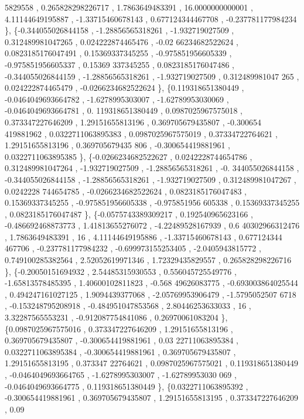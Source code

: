 \begin{DoxyCode}
      5829558 , 0.265828298226717 ,   1.7863649483391 ,  16.0000000000001 ,  4.11144649195887 , -1.33715460678143 
      , 0.677124344467708 , -0.237781177984234 \},
\{-0.344055026844158 , -1.28856565318261 ,   -1.932719027509 , 0.312489981047265 , 0.024222874465476 , -0.02
      66234682522624 , 0.0823185176047491 ,  0.15369337345255 , -0.975851956605339 , -0.975851956605337 ,  0.15369
      337345255 , 0.0823185176047486 , -0.344055026844159 , -1.28856565318261 ,   -1.932719027509 , 0.312489981047
      265 , 0.024222874465479 , -0.0266234682522624 \},
\{0.119318651380449 , -0.0464049693664782 ,  -1.6278995303007 , -1.62789953030069 , -0.0464049693664781 , 0.
      119318651380449 , 0.0987025967575018 , 0.373347227646209 ,  1.29151655813196 , 0.369705679435807 , -0.300654
      419881962 , 0.0322711063895383 , 0.0987025967575019 ,  0.37334722764621 ,  1.29151655813196 , 0.369705679435
      806 , -0.300654419881961 , 0.0322711063895385 \},
\{-0.0266234682522627 , 0.0242228744654786 , 0.312489981047264 ,   -1.932719027509 , -1.28856565318261 , -0.
      344055026844158 , -0.344055026844158 , -1.28856565318261 ,   -1.932719027509 , 0.312489981047267 , 0.0242228
      744654785 , -0.0266234682522624 , 0.0823185176047483 ,  0.15369337345255 , -0.975851956605338 , -0.975851956
      605338 ,  0.15369337345255 , 0.0823185176047487 \},
\{-0.0575743389309217 , 0.192540965623166 , -0.486692468873773 ,  1.41813655276072 , -4.22489528167939 , 0.6
      40302966312476 ,   1.7863649483391 ,                16 ,  4.11144649195886 , -1.33715460678143 , 0.677124344
      467706 , -0.237781177984232 , -0.699973155253405 ,  -2.0405943815772 , 0.749100285382564 ,  2.52052619971346
       ,  1.72329435829557 , 0.265828298226716 \},
\{-0.20050151694932 ,  2.54485315930553 , 0.556045725549776 , -1.65813578485395 ,  1.40600102811823 , -0.568
      49626083775 , -0.693003864025544 , 0.494247161027125 ,   1.9094439377068 , -2.05769953906479 , -1.5795052507
      6718 , -0.153248795208918 , -0.484951047853568 ,  2.80446253633033 ,                16 ,  3.32287565553231 ,
       -0.912087754841086 ,  0.26970061083204 \},
\{0.0987025967575016 , 0.373347227646209 ,  1.29151655813196 , 0.369705679435807 , -0.300654419881961 , 0.03
      22711063895384 , 0.0322711063895384 , -0.300654419881961 , 0.369705679435807 ,  1.29151655813195 ,  0.373347
      22764621 , 0.0987025967575021 , 0.119318651380449 , -0.0464049693664765 ,  -1.6278995303007 , -1.62789953030
      069 , -0.0464049693664775 , 0.119318651380449 \},
\{0.0322711063895392 , -0.300654419881961 , 0.369705679435807 ,  1.29151655813195 , 0.373347227646209 , 0.09

\end{DoxyCode}
